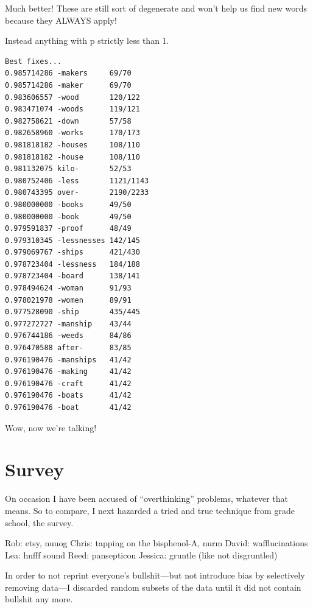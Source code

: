 \documentclass[twocolumn]{article}
\begin{document}
Much better! These are still sort of degenerate and won't help
us find new words because they ALWAYS apply!

Instead anything with p strictly less than 1.
\begin{verbatim}
Best fixes...
0.985714286 -makers     69/70
0.985714286 -maker      69/70
0.983606557 -wood       120/122
0.983471074 -woods      119/121
0.982758621 -down       57/58
0.982658960 -works      170/173
0.981818182 -houses     108/110
0.981818182 -house      108/110
0.981132075 kilo-       52/53
0.980752406 -less       1121/1143
0.980743395 over-       2190/2233
0.980000000 -books      49/50
0.980000000 -book       49/50
0.979591837 -proof      48/49
0.979310345 -lessnesses 142/145
0.979069767 -ships      421/430
0.978723404 -lessness   184/188
0.978723404 -board      138/141
0.978494624 -woman      91/93
0.978021978 -women      89/91
0.977528090 -ship       435/445
0.977272727 -manship    43/44
0.976744186 -weeds      84/86
0.976470588 after-      83/85
0.976190476 -manships   41/42
0.976190476 -making     41/42
0.976190476 -craft      41/42
0.976190476 -boats      41/42
0.976190476 -boat       41/42
\end{verbatim}

Wow, now we're talking!

\section{Survey}

On occasion I have been accused of ``overthinking'' problems, whatever
that means. So to compare, I next hazarded a tried and true technique
from grade school, the survey.

Rob: etsy, nuuog
Chris: tapping on the bisphenol-A, nurm
David: wafflucinations
Lea: hnfff sound
Reed: pansepticon
Jessica: gruntle (like not disgruntled)

In order to not reprint everyone's bullshit---but not introduce bias by selectively removing data---I discarded random subsets of the data until it did not contain bullshit any more.




\end{document}

